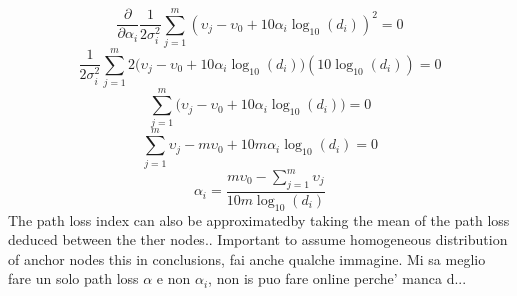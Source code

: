 \documentclass[12pt,twoside]{report}
\begin{document}
\begin{equation}
\frac{\partial}{\partial \alpha_i} \frac{1}{2\sigma^2_i}\sum_{j=1}^m(\upsilon_j-\upsilon_0+10\alpha_i\log_{10}(d_i))^2 =0
\end{equation}
\begin{equation}
\frac{1}{2\sigma^2_i}\sum_{j=1}^m2\big(\upsilon_j-\upsilon_0+10\alpha_i\log_{10}(d_i)\big)(10\log_{10}(d_i)) =0
\end{equation}
\begin{equation}
\sum_{j=1}^m\big(\upsilon_j-\upsilon_0+10\alpha_i\log_{10}(d_i)\big) =0
\end{equation}
\begin{equation}
\sum_{j=1}^m\upsilon_j-m\upsilon_0+10m\alpha_i\log_{10}(d_i)=0
\end{equation}
\begin{equation}
    \alpha_i=\frac{m\upsilon_0-\sum_{j=1}^m\upsilon_j}{10m\log_{10}(d_i)}
\end{equation}
The path loss index can also be approximatedby taking the mean of the path loss deduced between the ther nodes..
Important to assume homogeneous distribution of anchor nodes this in conclusions, fai anche qualche immagine.
Mi sa meglio fare un solo path loss $\alpha$ e non $\alpha_i$, non is puo fare online perche' manca d...
\fi
\end{document}
